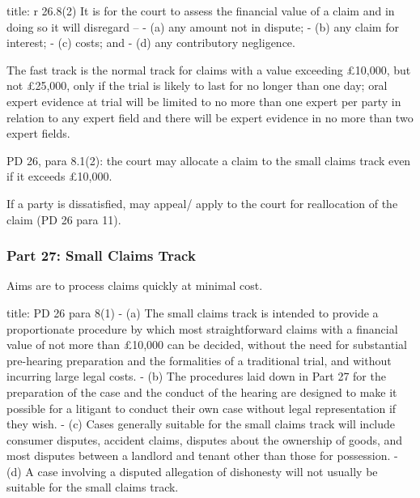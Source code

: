 \documentclass[
]{article}
\newenvironment{Shaded}{}{}
\newcommand{\NormalTok}[1]{#1}
\begin{document}
\begin{Shaded}
\begin{Highlighting}[]
\NormalTok{title: r 26.8(2)}
\NormalTok{It is for the court to assess the financial value of a claim and in doing so it will disregard –}
\NormalTok{{-} (a) any amount not in dispute;}
\NormalTok{{-} (b) any claim for interest;}
\NormalTok{{-} (c) costs; and}
\NormalTok{{-} (d) any contributory negligence.}
\end{Highlighting}
\end{Shaded}

The fast track is the normal track for claims with a value exceeding
£10,000, but not £25,000, only if the trial is likely to last for no
longer than one day; oral expert evidence at trial will be limited to no
more than one expert per party in relation to any expert field and there
will be expert evidence in no more than two expert fields.

PD 26, para 8.1(2): the court may allocate a claim to the small claims
track even if it exceeds £10,000.

If a party is dissatisfied, may appeal/ apply to the court for
reallocation of the claim (PD 26 para 11).

\hypertarget{part-27-small-claims-track}{%
\subsubsection{Part 27: Small Claims
Track}\label{part-27-small-claims-track}}

Aims are to process claims quickly at minimal cost.

\begin{Shaded}
\begin{Highlighting}[]
\NormalTok{title: PD 26 para 8(1)}
\NormalTok{{-} (a) The small claims track is intended to provide a proportionate procedure by which most straightforward claims with a financial value of not more than £10,000 can be decided, without the need for substantial pre{-}hearing preparation and the formalities of a traditional trial, and without incurring large legal costs.}
\NormalTok{{-} (b) The procedures laid down in Part 27 for the preparation of the case and the conduct of the hearing are designed to make it possible for a litigant to conduct their own case without legal representation if they wish.}
\NormalTok{{-} (c) Cases generally suitable for the small claims track will include consumer disputes, accident claims, disputes about the ownership of goods, and most disputes between a landlord and tenant other than those for possession.}
\NormalTok{{-} (d) A case involving a disputed allegation of dishonesty will not usually be suitable for the small claims track.}
\end{Highlighting}
\end{Shaded}
\end{document}
